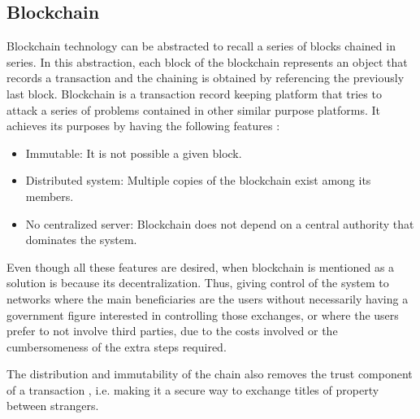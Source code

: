 \subsection{Blockchain}

Blockchain technology can be abstracted to recall a series of blocks chained in series. In this abstraction, each block of the blockchain represents an object that records a transaction and the chaining is obtained by referencing the previously last block. Blockchain is a transaction record keeping platform that tries to attack a series of problems contained in other similar purpose platforms. It achieves its purposes by having the following features \cite{block}:

\begin{itemize}
\item Immutable: It is not possible a given block.
\item Distributed system: Multiple copies of the blockchain exist among its members.
\item No centralized server: Blockchain does not depend on a central authority that dominates the system.            
\end{itemize}
Even though all these features are desired, when blockchain is mentioned as a solution is because its decentralization. Thus, giving control of the system to networks where the main beneficiaries are the users without necessarily having a government figure interested in controlling those exchanges, or where the users prefer to not involve third parties, due to the costs involved or the cumbersomeness of the extra steps required. 

The distribution and immutability of the chain also removes the trust component of a transaction \cite{iot}, i.e. making it a secure way to exchange titles of property between strangers.
